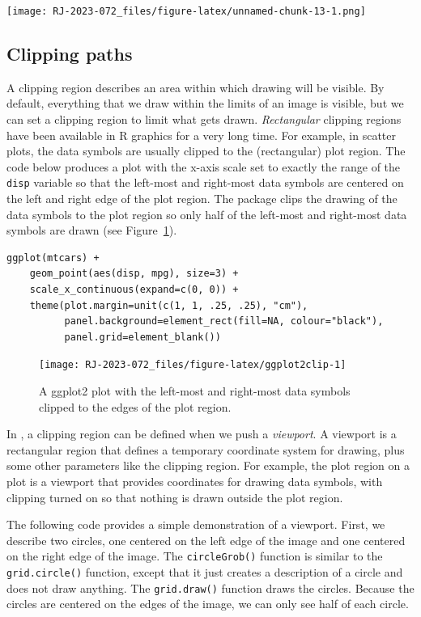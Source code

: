 \texttt{[image: RJ-2023-072\_files/figure-latex/unnamed-chunk-13-1.png]}

\hypertarget{clipping-paths}{%
\subsection{Clipping paths}\label{clipping-paths}}

A clipping region describes an area within which drawing will be visible.
By default, everything that we draw within the limits of an image is
visible, but we can set a clipping region to limit what gets drawn.
\emph{Rectangular} clipping regions have been available in R graphics
for a very long time.
For example, in scatter plots, the data symbols are usually
clipped to the (rectangular) plot region. The code below
produces a  plot with
the x-axis scale set to
exactly the range of the \texttt{disp} variable so that the left-most and right-most
data symbols are centered on the left and right edge of the plot region.
The  package clips the drawing of the data symbols to the
plot region so only
half of the left-most and right-most data symbols are drawn
(see Figure~\ref{fig:ggplot2clip}).

\begin{verbatim}
ggplot(mtcars) +
    geom_point(aes(disp, mpg), size=3) +
    scale_x_continuous(expand=c(0, 0)) +
    theme(plot.margin=unit(c(1, 1, .25, .25), "cm"),
          panel.background=element_rect(fill=NA, colour="black"),
          panel.grid=element_blank())
\end{verbatim}

\begin{figure}[h]
\texttt{[image: RJ-2023-072\_files/figure-latex/ggplot2clip-1]} \caption{A ggplot2 plot with the left-most and right-most data symbols clipped to the edges of the plot region.}\label{fig:ggplot2clip}
\end{figure}

In , a clipping region can be defined when we push a \emph{viewport}.
A viewport is a rectangular region that defines a temporary coordinate
system for drawing, plus some other parameters like the clipping region.
For example, the plot region on a  plot is a 
viewport that provides coordinates for drawing data symbols, with
clipping turned on so that nothing is drawn outside the plot region.

The following code provides a simple demonstration of a viewport.
First, we describe two circles, one centered on the left edge of
the image and one centered on the right edge of the image.
The \texttt{circleGrob()} function is similar
to the \texttt{grid.circle()} function, except that it just creates a
description of a circle and does not draw anything.
The \texttt{grid.draw()} function draws the circles.
Because the circles are centered on the edges of the image,
we can only see half of each circle.

